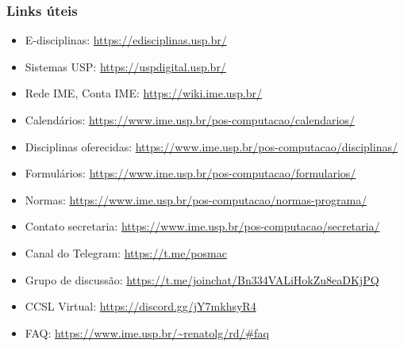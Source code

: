 \documentclass{beamer}
\begin{document}
\begin{frame}
  \frametitle{Links úteis}

  \begin{itemize}
    \item E-disciplinas: {\tiny\url{https://edisciplinas.usp.br/}}
    \item Sistemas USP: {\tiny\url{https://uspdigital.usp.br/}}
    \item Rede IME, Conta IME: {\tiny\url{https://wiki.ime.usp.br/}}
    \item Calendários: {\tiny\url{https://www.ime.usp.br/pos-computacao/calendarios/}}
    \item Disciplinas oferecidas: {\tiny\url{https://www.ime.usp.br/pos-computacao/disciplinas/}}
    \item Formulários: {\tiny\url{https://www.ime.usp.br/pos-computacao/formularios/}}
    \item Normas: {\tiny\url{https://www.ime.usp.br/pos-computacao/normas-programa/}}
    \item Contato secretaria: {\tiny\url{https://www.ime.usp.br/pos-computacao/secretaria/}}
    \item Canal do Telegram: {\tiny\url{https://t.me/posmac}}
    \item Grupo de discussão: {\tiny\url{https://t.me/joinchat/Bn334VALiHokZu8eaDKjPQ}}
    \item CCSL Virtual: {\tiny\url{https://discord.gg/jY7mkhsyR4}}
    \item FAQ: {\tiny\url{https://www.ime.usp.br/~renatolg/rd/\#faq}}
  \end{itemize}
\end{frame}
\end{document}
